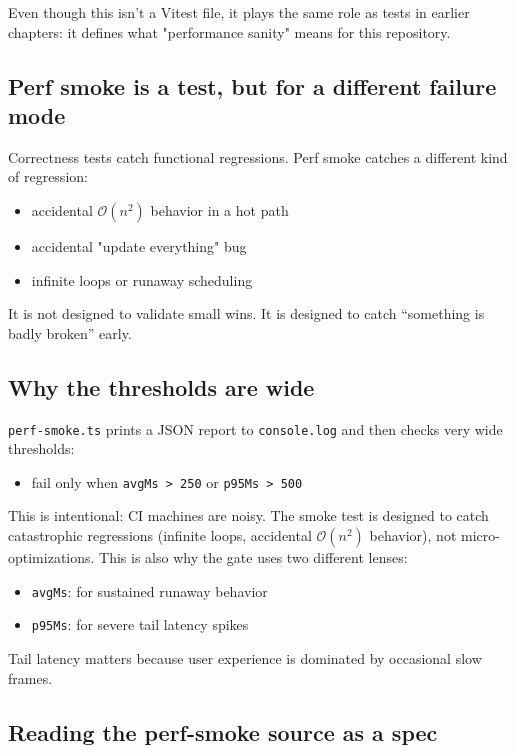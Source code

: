 Even though this isn't a Vitest file, it plays the same role as tests in earlier chapters: it defines what "performance sanity" means for this repository.

\subsection{Perf smoke is a test, but for a different failure mode}

Correctness tests catch functional regressions.
Perf smoke catches a different kind of regression:

\begin{itemize}
\item accidental \(\mathcal{O}(n^2)\) behavior in a hot path
\item accidental "update everything" bug
\item infinite loops or runaway scheduling
\end{itemize}

It is not designed to validate small wins.
It is designed to catch ``something is badly broken'' early.

\subsection{Why the thresholds are wide}

\texttt{perf-smoke.ts} prints a JSON report to \texttt{console.log} and then checks very wide thresholds:

\begin{itemize}
\item fail only when \texttt{avgMs > 250} or \texttt{p95Ms > 500}
\end{itemize}

This is intentional: CI machines are noisy.
The smoke test is designed to catch catastrophic regressions (infinite loops, accidental \(\mathcal{O}(n^2)\) behavior), not micro-optimizations.
This is also why the gate uses two different lenses:

\begin{itemize}
\item \texttt{avgMs}: for sustained runaway behavior
\item \texttt{p95Ms}: for severe tail latency spikes
\end{itemize}

Tail latency matters because user experience is dominated by occasional slow frames.

\subsection{Reading the perf-smoke source as a spec}

